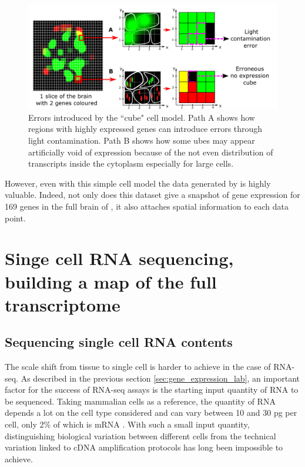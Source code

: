     \begin{figure}[h]
\centerline{\includegraphics[width=0.9\linewidth]{gfx/chapter2/cubeserrors.png}}
\caption{Errors introduced by the ``cube" cell model. Path A shows how regions with highly expressed genes can introduce errors through light contamination. Path B shows how some ubes may appear artificially void of expression because of the not even distribution of transcripts inside the cytoplasm especially for large cells.}\label{fig:cubeserrors}
	\end{figure}
	
	However, even with this simple cell model the data generated by \cite{Tomer10} is highly valuable. Indeed, not only does this dataset give a snapshot of gene expression for 169 genes in the full brain of \platy{}, it also attaches spatial information to each data point.\\

\section{Singe cell RNA sequencing, building a map of the full transcriptome}\label{sec:single_cell_rnaseq}
  \subsection{Sequencing single cell RNA contents}
	The scale shift from tissue to single cell is harder to achieve in the case of RNA-seq. As described in the previous section \ref{sec:gene_expression_lab}, an important factor for the success of RNA-seq assays is the starting input quantity of RNA to be sequenced. Taking mammalian cells as a reference, the quantity of RNA depends a lot on the cell type considered and can vary between 10 and 30 pg per cell, only 2\% of which is mRNA \cite{iscove02,islam11}. With such a small input quantity, distinguishing biological variation between different cells from the technical variation linked to cDNA amplification protocols has long been impossible to achieve.\\

